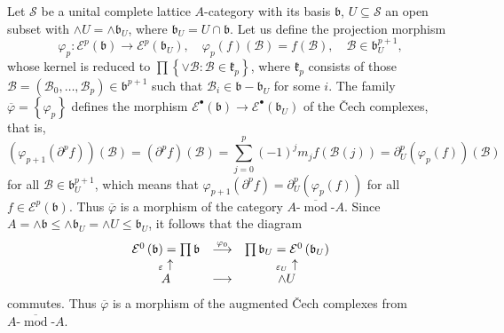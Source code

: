 \documentclass[12pt]{amsart}%
\theoremstyle{plain}
\numberwithin{equation}{section}
\numberwithin{equation}{section}
\numberwithin{theorem}{section}
\numberwithin{lemma}{section}
\numberwithin{remark}{section}
\numberwithin{example}{section}
\numberwithin{proposition}{section}
\numberwithin{definition}{section}
\numberwithin{corollary}{section}
\begin{document}
Let $\mathcal{S}$ be a unital complete lattice $A$-category with its basis
$\mathfrak{b}$, $U\subseteq\mathcal{S}$ an open subset with $\wedge
U=\wedge\mathfrak{b}_{U}$, where $\mathfrak{b}_{U}=U\cap\mathfrak{b}$. Let us
define the projection morphism
\[
\varphi_{p}:\mathcal{E}^{p}\left(  \mathfrak{b}\right)  \longrightarrow
\mathcal{E}^{p}\left(  \mathfrak{b}_{U}\right)  ,\quad\varphi_{p}\left(
f\right)  \left(  \mathcal{B}\right)  =f\left(  \mathcal{B}\right)
,\quad\mathcal{B}\in\mathfrak{b}_{U}^{p+1},
\]
whose kernel is reduced to $\prod\left\{  \vee\mathcal{B}:\mathcal{B}%
\in\mathfrak{k}_{p}\right\}  $, where $\mathfrak{k}_{p}$ consists of those
$\mathcal{B}=\left(  \mathcal{B}_{0},\ldots,\mathcal{B}_{p}\right)
\in\mathfrak{b}^{p+1}$ such that $\mathcal{B}_{i}\in\mathfrak{b-b}_{U}$ for
some $i$. The family $\overline{\varphi}=\left\{  \varphi_{p}\right\}  $
defines the morphism $\mathcal{E}^{\bullet}\left(  \mathfrak{b}\right)
\rightarrow\mathcal{E}^{\bullet}\left(  \mathfrak{b}_{U}\right)  $ of the
\v{C}ech complexes, that is,
\[
\left(  \varphi_{p+1}\left(  \partial^{p}f\right)  \right)  \left(
\mathcal{B}\right)  =\left(  \partial^{p}f\right)  \left(  \mathcal{B}\right)
=\sum_{j=0}^{p}\left(  -1\right)  ^{j}m_{j}f\left(  \mathcal{B}\left(
j\right)  \right)  =\partial_{U}^{p}\left(  \varphi_{p}\left(  f\right)
\right)  \left(  \mathcal{B}\right)
\]
for all $\mathcal{B}\in\mathfrak{b}_{U}^{p+1}$, which means that
$\varphi_{p+1}\left(  \partial^{p}f\right)  =\partial_{U}^{p}\left(
\varphi_{p}\left(  f\right)  \right)  $ for all $f\in\mathcal{E}^{p}\left(
\mathfrak{b}\right)  $. Thus $\overline{\varphi}$ is a morphism of the
category $\overline{A\text{-}\operatorname*{mod}\text{-}A}$. Since
$A=\wedge\mathfrak{b\leq\wedge}\mathfrak{b}_{U}=\wedge U\leq\mathfrak{b}_{U}$,
it follows that the diagram
\[%
\begin{array}
[c]{ccc}%
\mathcal{E}^{0}\left(  \mathfrak{b}\right)  =\prod\mathfrak{b} &
\overset{\varphi_{0}}{\longrightarrow} & \prod\mathfrak{b}_{U}=\mathcal{E}%
^{0}\left(  \mathfrak{b}_{U}\right) \\
_{\varepsilon}\uparrow &  & _{\varepsilon_{U}}\uparrow\\
A & \longrightarrow & \wedge U
\end{array}
\]
commutes. Thus $\overline{\varphi}$ is a morphism of the augmented \v{C}ech
complexes from $\overline{A\text{-}\operatorname*{mod}\text{-}A}$.
\end{document}

